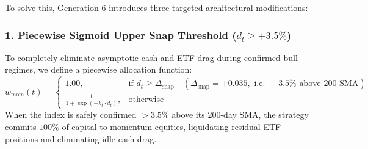 \documentclass[11pt,a4paper]{article}
\begin{document}
To solve this, Generation 6 introduces three targeted architectural modifications:

\subsubsection{1. Piecewise Sigmoid Upper Snap Threshold ($d_t \ge +3.5\%$)}
To completely eliminate asymptotic cash and ETF drag during confirmed bull regimes, we define a piecewise allocation function:
\begin{equation}
w_{\text{mom}}(t) = 
\begin{cases}
1.00, & \text{if } d_t \ge \Delta_{\text{snap}} \quad (\Delta_{\text{snap}} = +0.035, \text{ i.e. } +3.5\% \text{ above 200 SMA}) \\
\frac{1}{1 + \exp\left( -k_t \cdot d_t \right)}, & \text{otherwise}
\end{cases}
\end{equation}
When the index is safely confirmed $>3.5\%$ above its 200-day SMA, the strategy commits $100\%$ of capital to momentum equities, liquidating residual ETF positions and eliminating idle cash drag.
\end{document}
